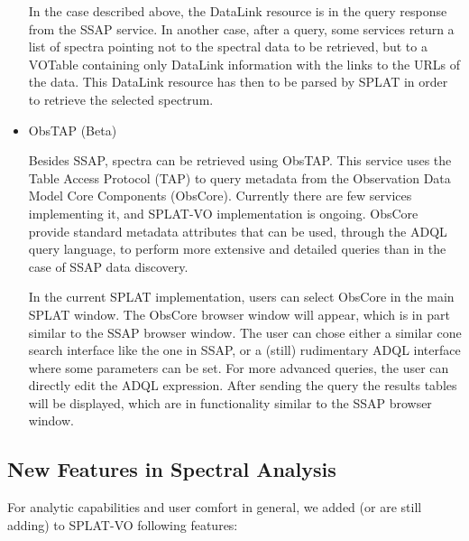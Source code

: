 \documentclass[final,authoryear,5p,times,twocolumn]{elsarticle}
\begin{document}
\begin{itemize}
In the case described above, the DataLink resource is in the query
response from the SSAP service. In another case, after a query, some
services return a list of spectra pointing not to the spectral data to
be retrieved, but to a VOTable containing only DataLink information
with the links to the URLs of the data. This DataLink resource has
then to be parsed by SPLAT in order to retrieve the selected spectrum.

\item{ObsTAP (Beta)}

  Besides SSAP, spectra can be retrieved using ObsTAP. This service
  uses the Table Access Protocol (TAP) to query metadata from the
  Observation Data Model Core Components (ObsCore). Currently there
  are few services implementing it, and SPLAT-VO implementation is
  ongoing.  ObsCore provide standard metadata attributes that can be
  used, through the ADQL query language, to perform more extensive and
  detailed queries than in the case of SSAP data discovery.

  In the current SPLAT implementation, users can select ObsCore in the
  main SPLAT window. The ObsCore browser window will appear, which is
  in part similar to the SSAP browser window. The user can chose
  either a similar cone search interface like the one in SSAP, or a
  (still) rudimentary ADQL interface where some parameters can be
  set. For more advanced queries, the user can directly edit the ADQL
  expression. After sending the query the results tables will be
  displayed, which are in functionality similar to the SSAP browser
  window.

\end{itemize}

\subsection{New Features in Spectral Analysis}

For analytic capabilities and user comfort in general, we added (or are still adding) to SPLAT-VO following features:
\end{document}
